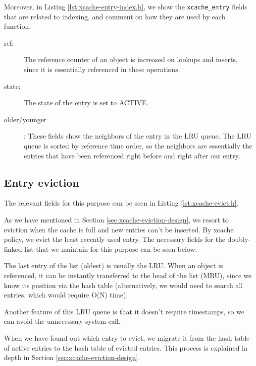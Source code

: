 Moreover, in Listing \ref{lst:xcache-entry-index.h}, we show the 
\texttt{xcache\_entry} fields that are related to indexing, and comment on how 
they are used by each function.


\begin{description}
	\item[ref:] The reference counter of an object is increased on lookups 
		and inserts, since it is essentially referenced in these 
		operations.
	\item[state:] The state of the entry is set to ACTIVE.
	\item[older/younger]: These fields show the neighbors of the entry in 
		the LRU queue. The LRU queue is sorted by reference time order, 
		so the neighbors are essentially the entries that have been 
		referenced right before and right after our entry.
\end{description}

\subsection{Entry eviction}\label{xcache-evict-imp}

The relevant fields for this purpose can be seen in Listing 
\ref{lst:xcache-evict.h}.


As we have mentioned in Section \ref{sec:xcache-eviction-design}, we resort to 
eviction when the cache is full and new entries can't be inserted. By xcache 
policy, we evict the least recently used entry. The necessary fields for the 
doubly-linked list that we maintain for this purpose can be seen below:


The last entry of the list (oldest) is usually the LRU. When an object is 
referenced, it can be instantly transferred to the head of the list (MRU), 
since we know its position via the hash table (alternatively, we would need to 
search all entries, which would require O(N) time).

Another feature of this LRU queue is that it doesn't require timestamps, so we 
can avoid the unnecessary system call.

When we have found out which entry to evict, we migrate it from the hash table 
of active entries to the hash table of evicted entries. This process is 
explained in depth in Section \ref{sec:xcache-eviction-design}.

